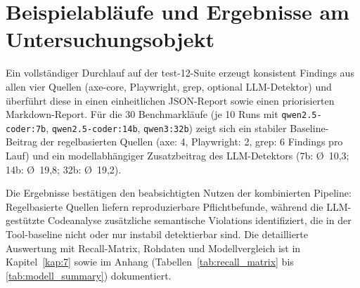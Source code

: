 \section{Beispielabläufe und Ergebnisse am Untersuchungsobjekt}
\label{sec:beispielablaeufe}

Ein vollständiger Durchlauf auf der test-12-Suite erzeugt konsistent Findings aus allen vier Quellen (axe-core, Playwright, grep, optional LLM-Detektor) und überführt diese in einen einheitlichen JSON-Report sowie einen priorisierten Markdown-Report. Für die 30 Benchmarkläufe (je 10 Runs mit \texttt{qwen2.5-coder:7b}, \texttt{qwen2.5-coder:14b}, \texttt{qwen3:32b}) zeigt sich ein stabiler Baseline-Beitrag der regelbasierten Quellen (axe: 4, Playwright: 2, grep: 6 Findings pro Lauf) und ein modellabhängiger Zusatzbeitrag des LLM-Detektors (7b: \O{}~10,3; 14b: \O{}~19,8; 32b: \O{}~19,2).

Die Ergebnisse bestätigen den beabsichtigten Nutzen der kombinierten Pipeline: Regelbasierte Quellen liefern reproduzierbare Pflichtbefunde, während die LLM-gestützte Codeanalyse zusätzliche semantische Violations identifiziert, die in der Tool-baseline nicht oder nur instabil detektierbar sind. Die detaillierte Auswertung mit Recall-Matrix, Rohdaten und Modellvergleich ist in Kapitel~\ref{kap:7} sowie im Anhang (Tabellen~\ref{tab:recall_matrix} bis \ref{tab:modell_summary}) dokumentiert.
